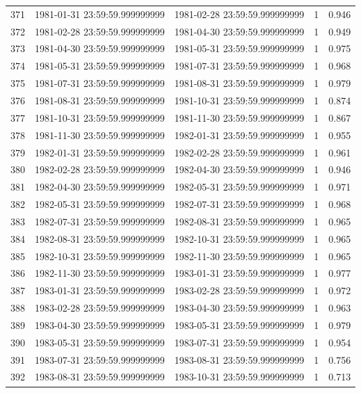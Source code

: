\begin{table}
\begin{tabular}{lcccc}
371 & 1981-01-31 23:59:59.999999999 & 1981-02-28 23:59:59.999999999 & 1 & 0.946 \\
372 & 1981-02-28 23:59:59.999999999 & 1981-04-30 23:59:59.999999999 & 1 & 0.949 \\
373 & 1981-04-30 23:59:59.999999999 & 1981-05-31 23:59:59.999999999 & 1 & 0.975 \\
374 & 1981-05-31 23:59:59.999999999 & 1981-07-31 23:59:59.999999999 & 1 & 0.968 \\
375 & 1981-07-31 23:59:59.999999999 & 1981-08-31 23:59:59.999999999 & 1 & 0.979 \\
376 & 1981-08-31 23:59:59.999999999 & 1981-10-31 23:59:59.999999999 & 1 & 0.874 \\
377 & 1981-10-31 23:59:59.999999999 & 1981-11-30 23:59:59.999999999 & 1 & 0.867 \\
378 & 1981-11-30 23:59:59.999999999 & 1982-01-31 23:59:59.999999999 & 1 & 0.955 \\
379 & 1982-01-31 23:59:59.999999999 & 1982-02-28 23:59:59.999999999 & 1 & 0.961 \\
380 & 1982-02-28 23:59:59.999999999 & 1982-04-30 23:59:59.999999999 & 1 & 0.946 \\
381 & 1982-04-30 23:59:59.999999999 & 1982-05-31 23:59:59.999999999 & 1 & 0.971 \\
382 & 1982-05-31 23:59:59.999999999 & 1982-07-31 23:59:59.999999999 & 1 & 0.968 \\
383 & 1982-07-31 23:59:59.999999999 & 1982-08-31 23:59:59.999999999 & 1 & 0.965 \\
384 & 1982-08-31 23:59:59.999999999 & 1982-10-31 23:59:59.999999999 & 1 & 0.965 \\
385 & 1982-10-31 23:59:59.999999999 & 1982-11-30 23:59:59.999999999 & 1 & 0.965 \\
386 & 1982-11-30 23:59:59.999999999 & 1983-01-31 23:59:59.999999999 & 1 & 0.977 \\
387 & 1983-01-31 23:59:59.999999999 & 1983-02-28 23:59:59.999999999 & 1 & 0.972 \\
388 & 1983-02-28 23:59:59.999999999 & 1983-04-30 23:59:59.999999999 & 1 & 0.963 \\
389 & 1983-04-30 23:59:59.999999999 & 1983-05-31 23:59:59.999999999 & 1 & 0.979 \\
390 & 1983-05-31 23:59:59.999999999 & 1983-07-31 23:59:59.999999999 & 1 & 0.954 \\
391 & 1983-07-31 23:59:59.999999999 & 1983-08-31 23:59:59.999999999 & 1 & 0.756 \\
392 & 1983-08-31 23:59:59.999999999 & 1983-10-31 23:59:59.999999999 & 1 & 0.713 \\

\end{tabular}
\end{table}
